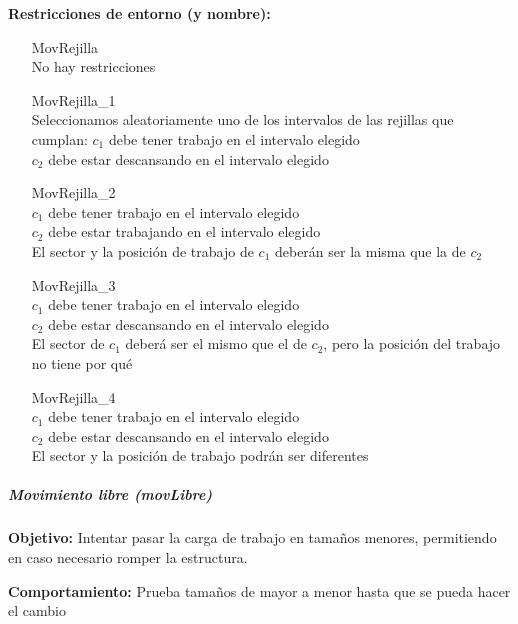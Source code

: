 \textbf{Restricciones de entorno (y nombre):}
\begin{enumerate}[align=parleft, labelsep=2cm, itemindent=5em, font=\itshape]
	\item[MovRejilla]\mbox{}\\No hay restricciones
	
	\item[MovRejilla\_1]\mbox{}\\
	Seleccionamos aleatoriamente uno de los intervalos de las rejillas que cumplan:
	$c_1$ debe tener trabajo en el intervalo elegido \\ 
	$c_2$ debe estar descansando en el intervalo elegido
	
	\item[MovRejilla\_2]\mbox{}\\
	$c_1$ debe tener trabajo en el intervalo elegido \\ 
	$c_2$ debe estar trabajando en el intervalo elegido \\
	El sector y la posición de trabajo de $c_1$ deberán ser la misma que la de $c_2$
	
	\item[MovRejilla\_3]\mbox{}\\
	$c_1$ debe tener trabajo en el intervalo elegido \\ 
	$c_2$ debe estar descansando en el intervalo elegido \\
	El sector de $c_1$ deberá ser el mismo que el de $c_2$, pero la posición del trabajo no tiene por qué
	
	\item[MovRejilla\_4]\mbox{}\\
	$c_1$ debe tener trabajo en el intervalo elegido \\ 
	$c_2$ debe estar descansando en el intervalo elegido \\
	El sector y la posición de trabajo podrán ser diferentes 
\end{enumerate}

\subparagraph{Movimiento libre (\textit{movLibre})}
\label{entorno:movLibre}

\textbf{Objetivo:} Intentar pasar la carga de trabajo en tamaños menores, permitiendo en caso necesario romper la estructura.

\textbf{Comportamiento:} Prueba tamaños de mayor a menor hasta que se pueda hacer el cambio

